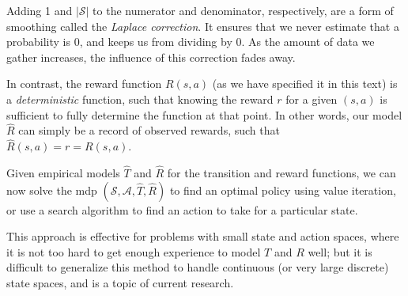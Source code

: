Adding 1 and $\left|\mathcal{S}\right|$ to the numerator and
denominator, respectively, are a form of smoothing called the {\em
    Laplace correction}. It ensures that we never estimate that a probability is
0, and keeps us from dividing by 0.  As the amount of data we gather
increases, the influence of this correction fades away.

In contrast, the reward function ${R}(s, a)$
(as we have specified it in this text) is a {\em deterministic}
function, such that knowing the reward $r$ for a given $(s, a)$ is
sufficient to fully determine the function at that point.  In other
words, our model $\hat{R}$ can simply be a record of observed rewards,
such that $\hat{R}(s, a) = r = R(s,a)$.


Given empirical models $\hat{T}$ and $\hat{R}$ for the transition and
reward functions, we can now solve the {\sc mdp} $(\mathcal{S},
  \mathcal{A}, \hat{T}, \hat{R})$ to find an optimal policy using value
iteration, or use a search algorithm to find an action
to take for a particular state.

This approach is effective for problems with small state and action
spaces, where it is not too hard to get enough experience to model $T$
and $R$ well; but it is difficult to generalize this method to handle
continuous (or very large discrete) state spaces, and is a topic of
current research.

